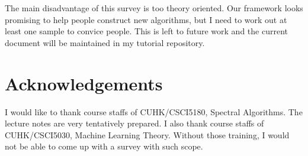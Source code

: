 The main disadvantage of this survey is too theory oriented. 
Our framework looks promising to help people construct 
new algorithms, but I need to work out at least 
one sample to convice people. This is left to future 
work and the current document will be maintained in 
my tutorial repository\cite{hu-tutorial}. 

\section*{Acknowledgements}

I would like to thank course staffs of 
CUHK/CSCI5180, Spectral Algorithms. The lecture notes are very tentatively 
prepared. I also thank course staffs of CUHK/CSCI5030, Machine Learning 
Theory. Without those training, I would not be able to 
come up with a survey with such scope. 




%


